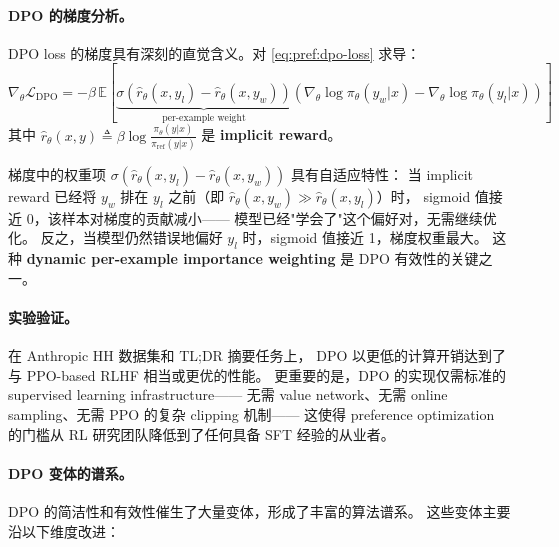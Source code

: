 \paragraph{DPO 的梯度分析。}
DPO loss 的梯度具有深刻的直觉含义。对 \cref{eq:pref:dpo-loss} 求导：
\begin{equation}
\label{eq:pref:dpo-gradient}
\nabla_\theta \mathcal{L}_{\text{DPO}} = -\beta\, \mathbb{E}\!\left[
  \underbrace{\sigma\!\left(\hat{r}_\theta(x, y_l) - \hat{r}_\theta(x, y_w)\right)}_{\text{per-example weight}}
  \left(
    \nabla_\theta \log \pi_\theta(y_w|x) - \nabla_\theta \log \pi_\theta(y_l|x)
  \right)
\right]
\end{equation}
其中 $\hat{r}_\theta(x, y) \triangleq \beta \log \frac{\pi_\theta(y|x)}{\pi_{\text{ref}}(y|x)}$
是 \textbf{implicit reward}。

梯度中的权重项 $\sigma(\hat{r}_\theta(x, y_l) - \hat{r}_\theta(x, y_w))$ 具有自适应特性：
当 implicit reward 已经将 $y_w$ 排在 $y_l$ 之前（即 $\hat{r}_\theta(x, y_w) \gg \hat{r}_\theta(x, y_l)$）时，
sigmoid 值接近 0，该样本对梯度的贡献减小——
模型已经"学会了"这个偏好对，无需继续优化。
反之，当模型仍然错误地偏好 $y_l$ 时，sigmoid 值接近 1，梯度权重最大。
这种 \textbf{dynamic per-example importance weighting} 是 DPO 有效性的关键之一。

\paragraph{实验验证。}
在 Anthropic HH 数据集和 TL;DR 摘要任务上，
DPO 以更低的计算开销达到了与 PPO-based RLHF 相当或更优的性能。
更重要的是，DPO 的实现仅需标准的 supervised learning infrastructure——
无需 value network、无需 online sampling、无需 PPO 的复杂 clipping 机制——
这使得 preference optimization 的门槛从 RL 研究团队降低到了任何具备 SFT 经验的从业者。

\paragraph{DPO 变体的谱系。}
DPO 的简洁性和有效性催生了大量变体，形成了丰富的算法谱系。
这些变体主要沿以下维度改进：

